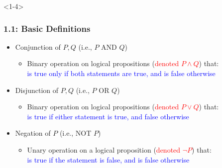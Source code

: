 \documentclass[10pt,english,aspectratio=169]{beamer}
\begin{document}
\begin{frame}<1-4> \frametitle{1.1: Basic Definitions}

\begin{itemize}

\item<1-> Conjunction of $P,Q$ (i.e., $P$ AND $Q$)

\begin{itemize}
  \setlength\itemsep{1mm}
  \item Binary operation on logical propositions (\textcolor{red}{denoted $P \wedge Q$}) that:\\ \hspace{2mm} \textcolor{blue}{is true only if both statements are true, and is false otherwise}
\end{itemize}

\vspace{0.5mm}

\item<2-> Disjunction of $P,Q$ (i.e., $P$ OR $Q$)

\begin{itemize}
  \setlength\itemsep{1mm}
  \item Binary operation on logical propositions (\textcolor{red}{denoted $P \vee Q$}) that: \\ \hspace{2mm} \textcolor{blue}{is true if either statement is true, and false otherwise}
\end{itemize}

\vspace{0.5mm}

\item<3-> Negation of $P$ (i.e., NOT $P$)

\begin{itemize}
  \setlength\itemsep{1mm}
  \item Unary operation on a logical proposition (\textcolor{red}{denoted $\neg P$}) that: \\ \hspace{2mm} \textcolor{blue}{is true if the statement is false, and is false otherwise}
\end{itemize}


\end{itemize}
\end{frame}
\end{document}

